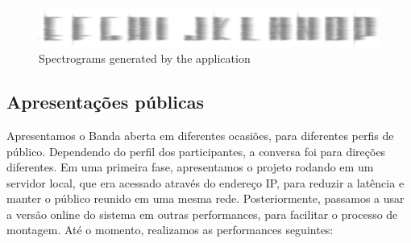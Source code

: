 \begin{figure}[!ht]
    
        \includegraphics[width=1\textwidth]{pictures/spectrogram}
        \vspace{-10pt}
    \caption{Spectrograms generated by the application}
    \vspace{-10pt}
    \label{fig:spectro}
\end{figure}







\subsection{Apresentações públicas}
Apresentamos o Banda aberta em diferentes ocasiões, para diferentes perfis de público. Dependendo do perfil dos participantes, a conversa foi para direções diferentes. Em uma primeira fase, apresentamos o projeto rodando em um servidor local, que era acessado através do endereço IP, para reduzir a latência e manter o público reunido em uma mesma rede. Posteriormente, passamos a usar a versão online do sistema em outras performances, para facilitar o processo de montagem. Até o momento, realizamos as performances seguintes:

